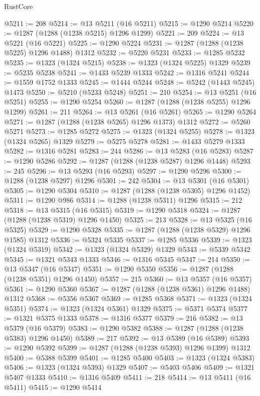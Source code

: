 \begin{lexlean}{RustCore}
\begin{coremodule}
@5211 := 208
@5214 := @13 @5211 (@16 @5211)
@5215 := @1290 @5214
@5220 := @1287 (@1288 (@1238 @5215) @1296 @1299)
@5221 := 209
@5224 := @13 @5221 (@16 @5221)
@5225 := @1290 @5224
@5231 := @1287 (@1288 (@1238 @5225) @1296 @1488) @1312
@5232 := @5220 @5231
@5233 := @1285 @5232
@5235 := @1323 (@1324 @5215)
@5238 := @1323 (@1324 @5225) @1329
@5239 := @5235 @5238
@5241 := @1433 @5239 @1333
@5242 := @1316 @5241
@5244 := @1559 @1752 @1333
@5245 := @1444 @5244
@5248 := @5242 (@1443 @5245) @1473
@5250 := @5210 (@5233 @5248)
@5251 := 210
@5254 := @13 @5251 (@16 @5251)
@5255 := @1290 @5254
@5260 := @1287 (@1288 (@1238 @5255) @1296 @1299)
@5261 := 211
@5264 := @13 @5261 (@16 @5261)
@5265 := @1290 @5264
@5271 := @1287 (@1288 (@1238 @5265) @1296 @1373) @1312
@5272 := @5260 @5271
@5273 := @1285 @5272
@5275 := @1323 (@1324 @5255)
@5278 := @1323 (@1324 @5265) @1329
@5279 := @5275 @5278
@5281 := @1433 @5279 @1333
@5282 := @1316 @5281
@5283 := 244
@5286 := @13 @5283 (@16 @5283)
@5287 := @1290 @5286
@5292 := @1287 (@1288 (@1238 @5287) @1296 @1448)
@5293 := 245
@5296 := @13 @5293 (@16 @5293)
@5297 := @1290 @5296
@5300 := @1288 (@1238 @5297) @1296
@5301 := 242
@5304 := @13 @5301 (@16 @5301)
@5305 := @1290 @5304
@5310 := @1287 (@1288 (@1238 @5305) @1296 @1452)
@5311 := @1290 @986
@5314 := @1288 (@1238 @5311) @1296
@5315 := 212
@5318 := @13 @5315 (@16 @5315)
@5319 := @1290 @5318
@5324 := @1287 (@1288 (@1238 @5319) @1296 @1450)
@5325 := 213
@5328 := @13 @5325 (@16 @5325)
@5329 := @1290 @5328
@5335 := @1287 (@1288 (@1238 @5329) @1296 @1585) @1312
@5336 := @5324 @5335
@5337 := @1285 @5336
@5339 := @1323 (@1324 @5319)
@5342 := @1323 (@1324 @5329) @1329
@5343 := @5339 @5342
@5345 := @1321 @5343 @1333
@5346 := @1316 @5345
@5347 := 214
@5350 := @13 @5347 (@16 @5347)
@5351 := @1290 @5350
@5356 := @1287 (@1288 (@1238 @5351) @1296 @1450)
@5357 := 215
@5360 := @13 @5357 (@16 @5357)
@5361 := @1290 @5360
@5367 := @1287 (@1288 (@1238 @5361) @1296 @1488) @1312
@5368 := @5356 @5367
@5369 := @1285 @5368
@5371 := @1323 (@1324 @5351)
@5374 := @1323 (@1324 @5361) @1329
@5375 := @5371 @5374
@5377 := @1321 @5375 @1333
@5378 := @1316 @5377
@5379 := 216
@5382 := @13 @5379 (@16 @5379)
@5383 := @1290 @5382
@5388 := @1287 (@1288 (@1238 @5383) @1296 @1450)
@5389 := 217
@5392 := @13 @5389 (@16 @5389)
@5393 := @1290 @5392
@5399 := @1287 (@1288 (@1238 @5393) @1296 @1399) @1312
@5400 := @5388 @5399
@5401 := @1285 @5400
@5403 := @1323 (@1324 @5383)
@5406 := @1323 (@1324 @5393) @1329
@5407 := @5403 @5406
@5409 := @1321 @5407 @1333
@5410 := @1316 @5409
@5411 := 218
@5414 := @13 @5411 (@16 @5411)
@5415 := @1290 @5414

\end{coremodule}
\end{lexlean}
